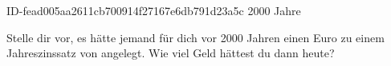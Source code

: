 \begin{exercise}
      {ID-fead005aa2611cb700914f27167e6db791d23a5c}
      {2000 Jahre}
  \ifproblem\problem\par
    Stelle dir vor, es hätte jemand für dich vor \num{2000} Jahren einen
    Euro zu einem Jahreszinssatz von  angelegt. Wie viel Geld
    hättest du dann heute?
  \fi
\end{exercise}
